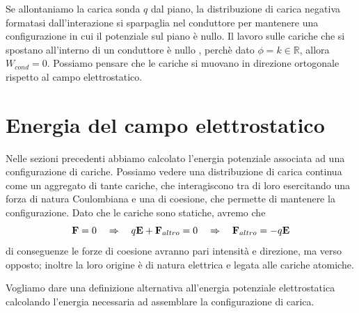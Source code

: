 Se allontaniamo la carica sonda $q$ dal piano, la distribuzione di carica negativa formatasi dall'interazione si sparpaglia nel conduttore per mantenere una configurazione in cui il potenziale sul piano \`e nullo. Il lavoro sulle cariche che si spostano all'interno di un conduttore \`e nullo , perch\`e dato $\phi = k \in \mathbb{R}$, allora $W_{cond} = 0$. Possiamo pensare che le cariche si muovano in direzione ortogonale rispetto al campo elettrostatico.

\section{Energia del campo elettrostatico}

Nelle sezioni precedenti abbiamo calcolato l'energia potenziale associata ad una configurazione di cariche. Possiamo vedere una distribuzione di carica continua come un aggregato di tante cariche, che interagiscono tra di loro esercitando una forza di natura Coulombiana e una di coesione, che permette di mantenere la configurazione. Dato che le cariche sono statiche, avremo che 
\begin{equation*}
	\bold{F} = 0 \quad \Rightarrow  \quad q\bold{E} + \bold{F}_{altro} = 0 \quad  \Rightarrow  \quad \bold{F}_{altro} =-q \bold{E}
\end{equation*} 
di conseguenze le forze di coesione avranno pari intensit\`a e direzione, ma verso opposto; inoltre la loro origine \`e di natura elettrica e legata alle cariche atomiche.

Vogliamo dare una definizione alternativa all'energia potenziale elettrostatica calcolando l'energia necessaria ad assemblare la configurazione di carica. 
\newline

